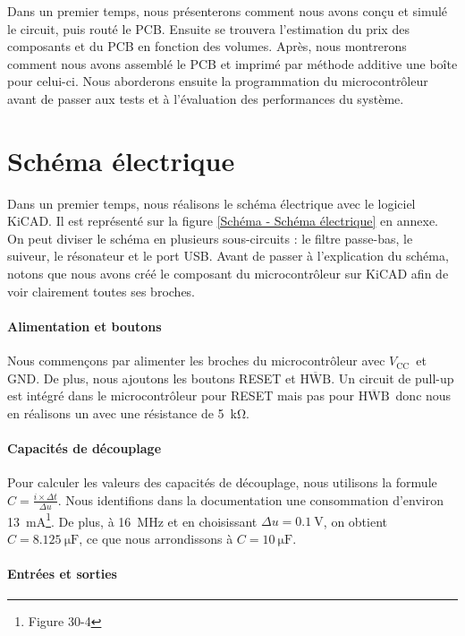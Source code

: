 \documentclass[12pt, a4paper, titlepage]{article}
\newcommand{\Vcc}{\ensuremath{V_{\text{CC}}}}
\newcommand{\GND}{\ensuremath{\text{GND}}}
\newcommand{\HWB}{\ensuremath{\overline{\text{HWB}}}}
\begin{document}
Dans un premier temps, nous présenterons comment nous avons conçu et simulé le circuit, puis routé le PCB. Ensuite se trouvera l'estimation du prix des composants et du PCB en fonction des volumes. Après, nous montrerons comment nous avons assemblé le PCB et imprimé par méthode additive une boîte pour celui-ci. Nous aborderons ensuite la programmation du microcontrôleur avant de passer aux tests et à l'évaluation des performances du système.

\section{Schéma électrique}

Dans un premier temps, nous réalisons le schéma électrique avec le logiciel KiCAD. Il est représenté sur la figure \ref{Schéma - Schéma électrique} en annexe. On peut diviser le schéma en plusieurs sous-circuits : le filtre passe-bas, le suiveur, le résonateur et le port USB. Avant de passer à l'explication du schéma, notons que nous avons créé le composant du microcontrôleur sur KiCAD afin de voir clairement toutes ses broches.

\paragraph{Alimentation et boutons}

Nous commençons par alimenter les broches du microcontrôleur avec \Vcc\ et \GND. De plus, nous ajoutons les boutons RESET et \HWB. Un circuit de pull-up est intégré dans le microcontrôleur pour RESET mais pas pour \HWB\ donc nous en réalisons un avec une résistance de \SI{5}{\kilo\ohm}.

\paragraph{Capacités de découplage}

Pour calculer les valeurs des capacités de découplage, nous utilisons la formule $C = \frac{i \times \Delta t}{\Delta u}$. Nous identifions dans la documentation \cite{Documentation ATMEGA32U4} une consommation d'environ \SI{13}{\milli\ampere}\footnote{Figure 30-4}. De plus, à \SI{16}{\mega\hertz} et en choisissant $\Delta u = \SI{0.1}{\volt}$, on obtient $C = \SI{8.125}{\micro\farad}$, ce que nous arrondissons à $\boxed{C = \SI{10}{\micro\farad}}$.

\paragraph{Entrées et sorties}
\end{document}
